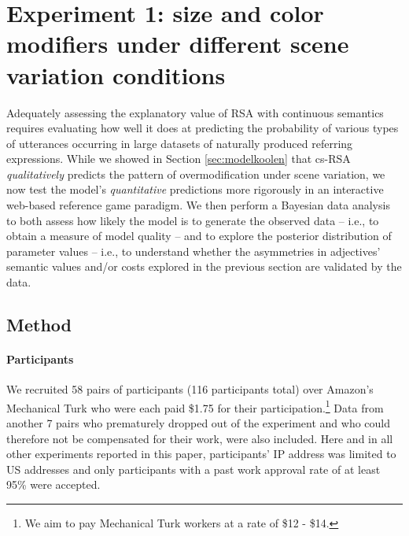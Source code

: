 \documentclass[11pt]{article}
\newcommand{\appref}[1]{Appendix \ref{#1}}
\newcommand{\sectionref}[1]{Section \ref{#1}}
\begin{document}
\section[]{Experiment 1: size and color modifiers under different scene variation conditions}
\label{sec:rsaevaluationbasicscene}

Adequately assessing the explanatory value of RSA with continuous semantics requires evaluating how well it does at predicting the probability of various types of utterances occurring in large datasets of naturally produced referring expressions. 
While we showed in \sectionref{sec:modelkoolen} that cs-RSA \emph{qualitatively} predicts the pattern of overmodification under scene variation, we now test the model's \emph{quantitative} predictions more rigorously in an interactive web-based reference game paradigm.
We then perform a Bayesian data analysis to both assess how likely the model is to generate the observed data -- i.e., to obtain a measure of model quality -- and to explore the posterior distribution of parameter values -- i.e., to understand whether the asymmetries in adjectives' semantic values and/or costs explored in the previous section are validated by the data.


\subsection{Method}

\paragraph{Participants}

We recruited 58 pairs of participants (116 participants total) over Amazon's Mechanical Turk who were each paid \$1.75 for their participation.\footnote{We aim to pay Mechanical Turk workers at a rate of \$12 - \$14.} Data from another 7 pairs who prematurely dropped out of the experiment and who could therefore not be compensated for their work, were also included. Here and in all other experiments reported in this paper, participants' IP address was limited to US addresses and only participants with a past work approval rate of at least 95\%  were accepted. 
\end{document}
